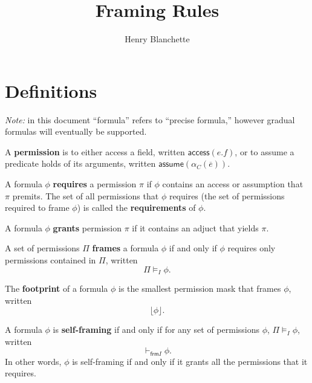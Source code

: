\documentclass{article}
\title{Framing Rules}
\author{Henry Blanchette}
\date{}
\newcommand{\tsf}{\textsf}
\newcommand{\access}{\tsf{access}}
\newcommand{\assume}{\tsf{assume}}
\newcommand{\footprint}[1]{\lfloor #1 \rfloor}
\newcommand{\frames}{\vDash_I}
\newcommand{\selfframing}{\vdash_{\tsf{frm}I}}
\renewcommand{\vec}{\overline}
\begin{document}

\maketitle

\section{Definitions}

\textit{Note:} in this document ``formula'' refers to ``precise formula,'' however gradual formulas will eventually be supported.

\noindent
A \textbf{permission} is to either access a field, written $\access(e.f)$, or to assume a predicate holds of its arguments, written $\assume(\alpha_C(\vec{e}))$.

\noindent
A formula $\phi$ \textbf{requires} a permission $\pi$ if $\phi$ contains an access or assumption that $\pi$ premits. The set of all permissions that $\phi$ requires (the set of permissions required to frame $\phi$) is called the \textbf{requirements} of $\phi$.

\noindent
A formula $\phi$ \textbf{grants} permission $\pi$ if it contains an adjuct that yields $\pi$.

\noindent
A set of permissions $\Pi$ \textbf{frames} a formula $\phi$ if and only if $\phi$ requires only permissions contained in $\Pi$, written $$ \Pi \frames \phi. $$

\noindent
The \textbf{footprint} of a formula $\phi$ is the smallest permission mask that frames $\phi$, written $$ \footprint \phi. $$

\noindent
A formula $\phi$ is \textbf{self-framing} if and only if for any set of permissions $\phi$, $\Pi \frames \phi$, written $$ \selfframing \phi. $$
In other words, $\phi$ is self-framing if and only if it grants all the permissions that it requires.

\newpage
\end{document}
